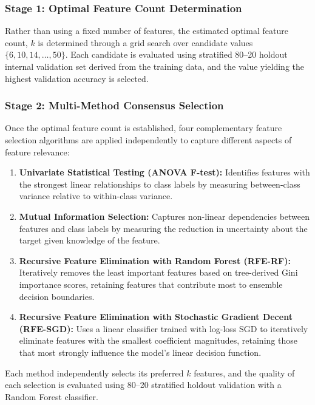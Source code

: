 \documentclass[pdflatex,sn-mathphys-num]{sn-jnl}
\theoremstyle{thmstyleone}%
\theoremstyle{thmstyletwo}%
\theoremstyle{thmstylethree}%
\begin{document}
\subsubsection{Stage 1: Optimal Feature Count Determination}
Rather than using a fixed number of features, the estimated optimal feature count, $k$ is determined through a grid search over candidate values $\{6, 10, 14, \ldots, 50\}$. Each candidate is evaluated using stratified 80--20 holdout internal validation set derived from the training data, and the value yielding the highest validation accuracy is selected.

\subsubsection{Stage 2: Multi-Method Consensus Selection}
Once the optimal feature count is established, four complementary feature selection algorithms are applied independently to capture different aspects of feature relevance:

\begin{enumerate}
    \item \textbf{Univariate Statistical Testing (ANOVA F-test):} Identifies features with the strongest linear relationships to class labels by measuring between-class variance relative to within-class variance.
    
    \item \textbf{Mutual Information Selection:} Captures non-linear dependencies between features and class labels by measuring the reduction in uncertainty about the target given knowledge of the feature.
    
    \item \textbf{Recursive Feature Elimination with Random Forest (RFE-RF):} Iteratively removes the least important features based on tree-derived Gini importance scores, retaining features that contribute most to ensemble decision boundaries.
    
    \item \textbf{Recursive Feature Elimination with Stochastic Gradient Decent (RFE-SGD):} Uses a linear classifier trained with log-loss SGD to iteratively eliminate features with the smallest coefficient magnitudes, retaining those that most strongly influence the model’s linear decision function.
\end{enumerate}

Each method independently selects its preferred $k$ features, and the quality of each selection is evaluated using 80--20 stratified holdout validation with a Random Forest classifier.
\end{document}
